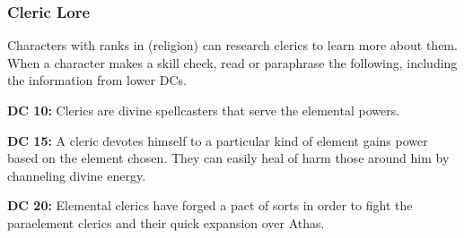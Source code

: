 \subsubsection{Cleric Lore}

Characters with ranks in  (religion) can research clerics to learn more about them. When a character makes a skill check, read or paraphrase the following, including the information from lower DCs.

\textbf{DC 10:} Clerics are divine spellcasters that serve the elemental powers.

\textbf{DC 15:} A cleric devotes himself to a particular kind of element gains power based on the element chosen. They can easily heal of harm those around him by channeling divine energy.

\textbf{DC 20:} Elemental clerics have forged a pact of sorts in order to fight the paraelement clerics and their quick expansion over Athas.
